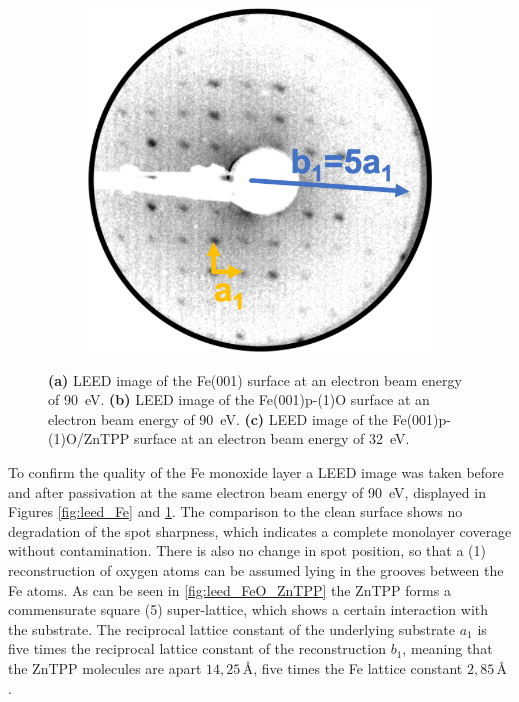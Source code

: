 \begin{figure}[h]
\begin{subfigure}{0.25\textwidth}
        \caption{}
        \label{fig:leed_FeO}
    \end{subfigure}
    \hfill
    \begin{subfigure}{0.25\textwidth}
        \includegraphics[width = \textwidth]{Plots/FeO_ZnTPP.png}
        \caption{}
        \label{fig:leed_FeO_ZnTPP}
    \end{subfigure}
    \caption{\textbf{(a)} LEED image of the Fe(001) surface at an electron beam energy of \qty{90}{eV}. \textbf{(b)} LEED image of the Fe(001)p-(1)O surface at an electron beam energy of \qty{90}{eV}. \textbf{(c)} LEED image of the Fe(001)p-(1)O/ZnTPP surface at an electron beam energy of \qty{32}{eV}.}
    \label{fig:leed_1}
\end{figure}
\FloatBarrier

To confirm the quality of the Fe monoxide layer a LEED image was taken before and after passivation at the same electron beam energy of \qty{90}{eV}, displayed in Figures \ref{fig:leed_Fe} and \ref{fig:leed_FeO}.
The comparison to the clean surface shows no degradation of the spot sharpness, which indicates a complete monolayer coverage without contamination.
There is also no change in spot position, so that a (1) reconstruction of oxygen atoms can be assumed lying in the grooves between the Fe atoms.
As can be seen in \autoref{fig:leed_FeO_ZnTPP} the ZnTPP forms a commensurate square (5) super-lattice, which shows a certain interaction with the substrate.
The reciprocal lattice constant of the underlying substrate $a_1$ is five times the reciprocal lattice constant of the reconstruction $b_1$, meaning that the ZnTPP molecules are apart $14,25\,$\r{A}, five times the Fe lattice constant $2,85\,$\r{A} \cite*{davey_precision_1925}.

